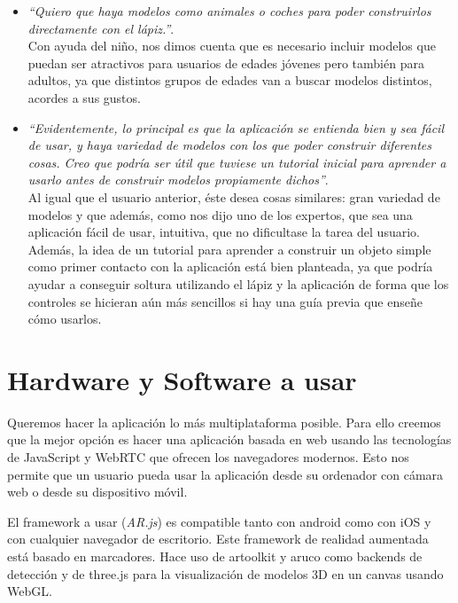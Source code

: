 \documentclass[12pt,a4paper]{article}
\begin{document}
\begin{itemize}
    \item \textit{``Quiero que haya modelos como animales o coches para poder construirlos directamente con el lápiz.''}.\\
    
    Con ayuda del niño, nos dimos cuenta que es necesario incluir modelos que puedan ser atractivos para usuarios de edades jóvenes pero también para adultos, ya que distintos grupos de edades van a buscar modelos distintos, acordes a sus gustos.\\
    
    \item \textit{``Evidentemente, lo principal es que la aplicación se entienda bien y sea fácil de usar, y haya variedad de modelos con los que poder construir diferentes cosas. Creo que podría ser útil que tuviese un tutorial inicial para aprender a usarlo antes de construir modelos propiamente dichos''}.\\
    
    Al igual que el usuario anterior, éste desea cosas similares: gran variedad de modelos y que además, como nos dijo uno de los expertos, que sea una aplicación fácil de usar, intuitiva, que no dificultase la tarea del usuario. Además, la idea de un tutorial para aprender a construir un objeto simple como primer contacto con la aplicación está bien planteada, ya que podría ayudar a conseguir soltura utilizando el lápiz y la aplicación de forma que los controles se hicieran aún más sencillos si hay una guía previa que enseñe cómo usarlos.
\end{itemize}

\section{Hardware y Software a usar}
Queremos hacer la aplicación lo más multiplataforma posible. Para ello creemos que la mejor opción es hacer una aplicación basada en web usando las tecnologías de JavaScript y WebRTC que ofrecen los navegadores modernos. Esto nos permite que un usuario pueda usar la aplicación desde su ordenador con cámara web o desde su dispositivo móvil. 

El framework a usar (\textit{AR.js}) es compatible tanto con android como con iOS y con cualquier navegador de escritorio. Este framework de realidad aumentada está basado en marcadores. Hace uso de artoolkit y aruco como backends de detección y de three.js para la visualización de modelos 3D en un canvas usando WebGL.
\end{document}

